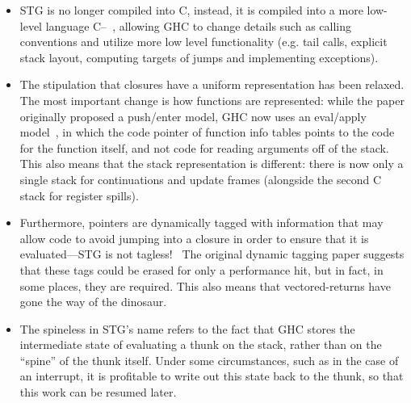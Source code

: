 \begin{itemize}
    \item STG is no longer compiled into C, instead, it is
        compiled into a more low-level language C--~\cite{Jones1999}, allowing
        GHC to change details such as calling conventions and utilize
        more low level functionality (e.g. tail calls, explicit stack
        layout, computing targets of jumps and implementing exceptions).
    \item The stipulation that closures have a uniform representation
        has been relaxed.  The most important change is how functions
        are represented: while the paper originally proposed a push/enter
        model, GHC now uses an eval/apply model~\cite{Marlow2006}, in
        which the code pointer of function info tables points to the code
        for the function itself, and not code for reading arguments off of
        the stack.  This also means that the stack representation is
        different: there is now only a single stack for continuations and
        update frames (alongside the second C stack for register spills).
    \item Furthermore, pointers are dynamically tagged with information
        that may allow code to avoid jumping into a closure in order to
        ensure that it is evaluated---STG is not
        tagless!~\cite{Marlow2007}  The original dynamic tagging paper
        suggests that these tags could be erased for only a performance
        hit, but in fact, in some places, they are required.  This also
        means that vectored-returns have gone the way of the dinosaur.
    \item The spineless in STG's name refers to the fact that GHC stores
        the intermediate state of evaluating a thunk on the stack,
        rather than on the ``spine'' of the thunk itself.  Under some
        circumstances, such as in the case of an interrupt, it is
        profitable to write out this state back to the thunk, so that
        this work can be resumed later.~\cite{Reid1999} 
\end{itemize}
